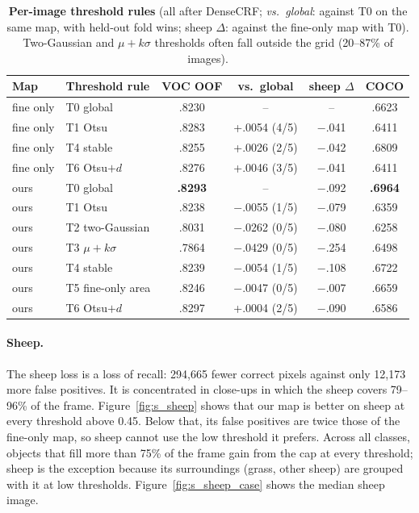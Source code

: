 \documentclass[10pt,twocolumn,letterpaper]{article}
\begin{document}
\begin{table}[t]
\centering
\scriptsize\setlength{\tabcolsep}{2.2pt}
\begin{tabular}{@{}llcccc@{}}
\toprule
Map & Threshold rule & VOC OOF & vs.\ global & sheep $\Delta$ & COCO \\
\midrule
fine only & T0 global & .8230 & -- & -- & .6623 \\
fine only & T1 Otsu & .8283 & +.0054 (4/5) & $-$.041 & .6411 \\
fine only & T4 stable & .8255 & +.0026 (2/5) & $-$.042 & .6809 \\
fine only & T6 Otsu$+d$ & .8276 & +.0046 (3/5) & $-$.041 & .6411 \\
\midrule
ours & T0 global & \textbf{.8293} & -- & $-$.092 & \textbf{.6964} \\
ours & T1 Otsu & .8238 & $-$.0055 (1/5) & $-$.079 & .6359 \\
ours & T2 two-Gaussian & .8031 & $-$.0262 (0/5) & $-$.080 & .6258 \\
ours & T3 $\mu{+}k\sigma$ & .7864 & $-$.0429 (0/5) & $-$.254 & .6498 \\
ours & T4 stable & .8239 & $-$.0054 (1/5) & $-$.108 & .6722 \\
ours & T5 fine-only area & .8246 & $-$.0047 (0/5) & $-$.007 & .6659 \\
ours & T6 Otsu$+d$ & .8297 & +.0004 (2/5) & $-$.090 & .6586 \\
\bottomrule
\end{tabular}
\caption{\textbf{Per-image threshold rules} (all after DenseCRF; \emph{vs.\ global}: against T0 on the same map, with held-out fold wins; sheep $\Delta$: against the fine-only map with T0). Two-Gaussian and $\mu{+}k\sigma$ thresholds often fall outside the grid (20--87\% of images).}
\label{tab:s_threshold}
\end{table}

\paragraph{Sheep.}
The sheep loss is a loss of recall: 294{,}665 fewer correct pixels against only 12{,}173 more false positives. It is concentrated in close-ups in which the sheep covers 79--96\% of the frame. Figure~\ref{fig:s_sheep} shows that our map is better on sheep at every threshold above 0.45. Below that, its false positives are twice those of the fine-only map, so sheep cannot use the low threshold it prefers. Across all classes, objects that fill more than 75\% of the frame gain from the cap at every threshold; sheep is the exception because its surroundings (grass, other sheep) are grouped with it at low thresholds. Figure~\ref{fig:s_sheep_case} shows the median sheep image.
\end{document}
